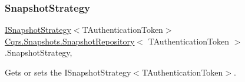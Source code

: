 \subsubsection{\texorpdfstring{Snapshot\+Strategy}{SnapshotStrategy}}
{\footnotesize\ttfamily \hyperlink{interfaceCqrs_1_1Snapshots_1_1ISnapshotStrategy}{I\+Snapshot\+Strategy}$<$T\+Authentication\+Token$>$ \hyperlink{classCqrs_1_1Snapshots_1_1SnapshotRepository}{Cqrs.\+Snapshots.\+Snapshot\+Repository}$<$ T\+Authentication\+Token $>$.Snapshot\+Strategy\hspace{0.3cm}{\ttfamily [get]}, {\ttfamily [protected]}}



Gets or sets the I\+Snapshot\+Strategy$<$\+T\+Authentication\+Token$>$. 

